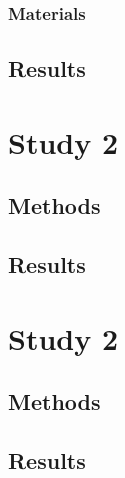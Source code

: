 \subsubsection{Materials}

\subsection{Results}

\section{Study 2}

\subsection{Methods}

\subsection{Results}

\section{Study 2}

\subsection{Methods}

\subsection{Results}
